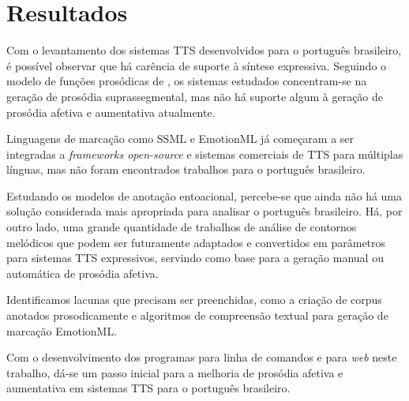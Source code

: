 
\chapter{Resultados}
Com o levantamento dos sistemas TTS desenvolvidos para o português brasileiro, é
possível observar que há carência de suporte à síntese expressiva. Seguindo o
modelo de funções prosódicas de , os sistemas estudados
concentram-se na geração de prosódia suprassegmental, mas não há suporte algum à
geração de prosódia afetiva e aumentativa atualmente.

Linguagens de marcação como SSML e EmotionML já começaram a ser integradas a
\emph{frameworks open-source} e sistemas comerciais de TTS para múltiplas
línguas, mas não foram encontrados trabalhos para o português brasileiro.

Estudando os modelos de anotação entoacional, percebe-se que ainda não há uma
solução considerada mais apropriada para analisar o português brasileiro. Há,
por outro lado, uma grande quantidade de trabalhos de análise de contornos
melódicos que podem ser futuramente adaptados e convertidos em parâmetros para
sistemas TTS expressivos, servindo como base para a geração manual ou automática
de prosódia afetiva.

Identificamos lacunas que precisam ser preenchidas, como a criação de corpus
anotados prosodicamente e algoritmos de compreensão textual para geração de
marcação EmotionML.

Com o desenvolvimento dos programas para linha de comandos e para \emph{web}
neste trabalho, dá-se um passo inicial para a melhoria de prosódia afetiva e
aumentativa em sistemas TTS para o português brasileiro.